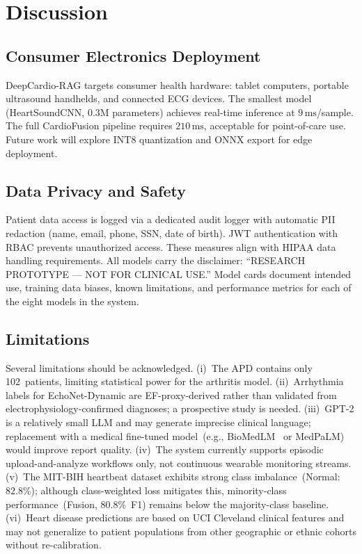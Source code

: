 \documentclass[journal,10pt,twoside]{IEEEtran}
\begin{document}
\section{Discussion}
\label{sec:discussion}

\subsection{Consumer Electronics Deployment}

DeepCardio-RAG targets consumer health hardware: tablet computers, portable ultrasound
handhelds, and connected ECG devices.
The smallest model (HeartSoundCNN, $0.3\text{M}$ parameters) achieves real-time
inference at $9\,\text{ms}$/sample.
The full CardioFusion pipeline requires $210\,\text{ms}$, acceptable for point-of-care
use.
Future work will explore INT8 quantization and ONNX export for edge deployment.

\subsection{Data Privacy and Safety}

Patient data access is logged via a dedicated audit logger with automatic PII
redaction (name, email, phone, SSN, date of birth).
JWT authentication with RBAC prevents unauthorized access.
These measures align with HIPAA data handling requirements.
All models carry the disclaimer: ``RESEARCH PROTOTYPE --- NOT FOR CLINICAL USE.''
Model cards document intended use, training data biases, known limitations, and
performance metrics for each of the eight models in the system.

\subsection{Limitations}

Several limitations should be acknowledged.
(i)~The APD contains only 102~patients, limiting statistical power for the arthritis
model.
(ii)~Arrhythmia labels for EchoNet-Dynamic are EF-proxy-derived rather than
validated from electrophysiology-confirmed diagnoses; a prospective study is needed.
(iii)~GPT-2 is a relatively small LLM and may generate imprecise clinical language;
replacement with a medical fine-tuned model~(e.g., BioMedLM~\cite{bolton2022} or
MedPaLM) would improve report quality.
(iv)~The system currently supports episodic upload-and-analyze workflows only, not
continuous wearable monitoring streams.
(v)~The MIT-BIH heartbeat dataset exhibits strong class imbalance~(Normal: $82.8\%$);
although class-weighted loss mitigates this, minority-class performance~(Fusion, $80.8\%$~F1)
remains below the majority-class baseline.
(vi)~Heart disease predictions are based on UCI Cleveland clinical features and may
not generalize to patient populations from other geographic or ethnic cohorts without
re-calibration.
\end{document}

